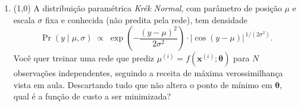 \documentclass[11pt,a4paper]{article}
\begin{document}
\begin{enumerate}[1)]
\begin{minipage}[t]{0.47\linewidth}
\begin{enumerate}[a)]
    \item $(4;\ 6;\ -2;\ 8)$
    \item $(8;\ -6;\ -6;\ 4)$
    \item $(2;\ 0;\ 3;\ 0{,}5)$
    \item $(0;\ 6;\ 0;\ 0)$
\end{enumerate}
\end{minipage}\hfill
\begin{minipage}[t]{0.47\linewidth}
\begin{enumerate}[a)]
\setcounter{enumii}{4}
    \item $(1;\ 0;\ 1;\ 1)$
    \item $(8;\ 0;\ -6;\ 4)$
    \item $(4;\ 0;\ -2;\ 8)$
    \item $(0;\ 0;\ 0;\ 0)$
\end{enumerate}
\end{minipage}

\item (1{,}0) A distribuição paramétrica \textit{Krék Normal}, com parâmetro de posição $\mu$ e escala $\sigma$ fixa e conhecida (não predita pela rede), tem densidade
\[
\Pr(y \mid \mu, \sigma) \;\propto\;
\exp\!\left(-\frac{(y - \mu)^2}{2\sigma^2}\right) \cdot
\bigl|\cos(y - \mu)\bigr|^{\,1/(2\sigma^2)} .
\]
Você quer treinar uma rede que prediz $\mu^{(i)} = f(\mathbf{x}^{(i)}; \boldsymbol{\theta})$ para $N$ observações independentes, seguindo a receita de máxima verossimilhança vista em aula. Descartando tudo que não altera o ponto de mínimo em $\boldsymbol{\theta}$, qual é a função de custo a ser minimizada?


\end{enumerate}
\end{document}
